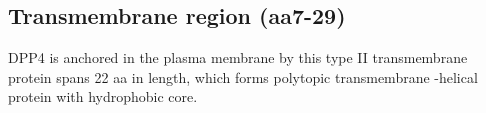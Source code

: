 \subsection{Transmembrane region (aa7-29)}

DPP4 is anchored in the plasma membrane by this type II transmembrane protein spans 22 aa in length, which forms polytopic transmembrane \alpha-helical protein with hydrophobic core.~\cite{Hong_1990}